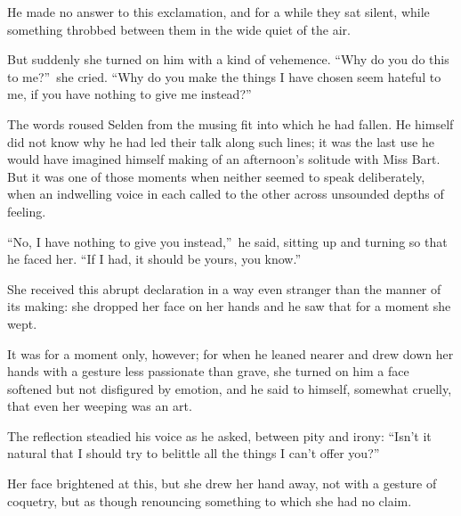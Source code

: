 \documentclass[12pt,a4paper]{book}
\begin{document}
He made no answer to this exclamation, and for a while they sat
silent, while something throbbed between them in the wide quiet
of the air.





But suddenly she turned on him with a kind of vehemence. ``Why do
you do this to me?''\ she cried. ``Why do you make the things I have
chosen seem hateful to me, if you have nothing to give me
instead?''





The words roused Selden from the musing fit into which he had
fallen. He himself did not know why he had led their talk along
such lines; it was the last use he would have imagined himself
making of an afternoon's solitude with Miss Bart. But it was one
of those moments when neither seemed to speak deliberately, when
an indwelling voice in each called to the other across unsounded
depths of feeling.





``No, I have nothing to give you instead,''\ he said, sitting up and
turning so that he faced her. ``If I had, it should be yours, you
know.''





She received this abrupt declaration in a way even stranger than
the manner of its making: she dropped her face on her hands and
he saw that for a moment she wept.





It was for a moment only, however; for when he leaned nearer and
drew down her hands with a gesture less passionate than grave,
she turned on him a face softened but not disfigured by emotion,
and he said to himself, somewhat cruelly, that even her weeping
was an art.





The reflection steadied his voice as he asked, between pity and
irony: ``Isn't it natural that I should try to belittle all the
things I can't offer you?''





Her face brightened at this, but she drew her hand away, not with
a gesture of coquetry, but as though renouncing something to
which she had no claim.
\end{document}
